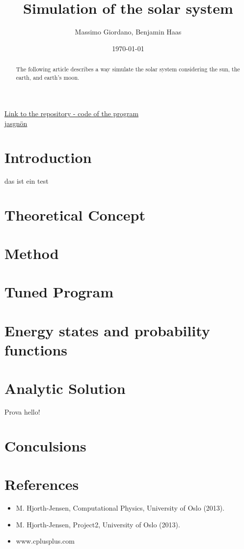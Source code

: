 \documentclass[a4paper]{article}
\title{\textbf{Simulation of the solar system}}
\author{Massimo Giordano, Benjamin Haas}
\date{\today}
\begin{document}
\maketitle
\begin{center}
\href{https://github.com/massimogiordano/repository/tree/master/restore_SOL/}{Link to the repository - code of the program\\jasgnön}
\end{center}

\begin{abstract}
The following article describes a way simulate the solar system considering the sun, the earth, and earth's moon. 
\end{abstract}
\tableofcontents
\pagebreak

\section{Introduction}
das ist ein test

\section{Theoretical Concept}
 
\section{Method}

\section{Tuned Program}
\section{Energy states and probability functions}\label{2electrons}

\pagebreak
\section{Analytic Solution}
Prova hello!
\pagebreak
\section{Conculsions}

\section{References}
\begin{itemize}
\item M. Hjorth-Jensen, 
Computational Physics, University of Oslo (2013).
\item M. Hjorth-Jensen, 
Project2, University of Oslo (2013).
\item www.cplusplus.com
\end{itemize}
\end{document}
